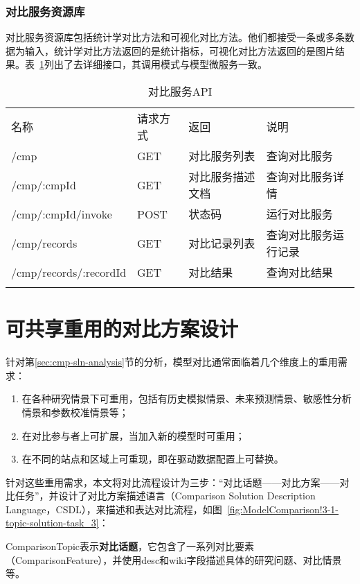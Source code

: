\subsubsection{对比服务资源库}
对比服务资源库包括统计学对比方法和可视化对比方法。他们都接受一条或多条数据为输入，统计学对比方法返回的是统计指标，可视化对比方法返回的是图片结果。表~\ref{tab:cmp-service-API}列出了去详细接口，其调用模式与模型微服务一致。

\begin{table}[!htbp]
    \centering
    \caption{对比服务API}
    \label{tab:cmp-service-API}
    \begin{tabular}{llll}
        \Xhline{1.5pt}
        名称 & 请求方式 & 返回 & 说明 \\
        \Xhline{1.5pt}
        /cmp & GET & 对比服务列表 & 查询对比服务 \\
        /cmp/:cmpId & GET & 对比服务描述文档 & 查询对比服务详情 \\
        /cmp/:cmpId/invoke & POST & 状态码 & 运行对比服务 \\ 
        /cmp/records & GET & 对比记录列表 & 查询对比服务运行记录 \\
        /cmp/records/:recordId & GET & 对比结果 & 查询对比结果 \\
        \Xhline{1.5pt}
    \end{tabular}
\end{table}

\section{可共享重用的对比方案设计}
\label{sec:cmp-CSDL}
针对第\ref{sec:cmp-sln-analysis}节的分析，模型对比通常面临着几个维度上的重用需求：
\begin{enumerate}[(1)]
    \item 在各种研究情景下可重用，包括有历史模拟情景、未来预测情景、敏感性分析情景和参数校准情景等；
    \item 在对比参与者上可扩展，当加入新的模型时可重用；
    \item 在不同的站点和区域上可重现，即在驱动数据配置上可替换。
\end{enumerate}

针对这些重用需求，本文将对比流程设计为三步：“对比话题——对比方案——对比任务”，并设计了对比方案描述语言（Comparison Solution Description Language，CSDL），来描述和表达对比流程，如图~\ref{fig:ModelComparison!3-1-topic-solution-task_3}：

ComparisonTopic表示\textbf{对比话题}，它包含了一系列对比要素（ComparisonFeature），并使用desc和wiki字段描述具体的研究问题、对比情景等。

